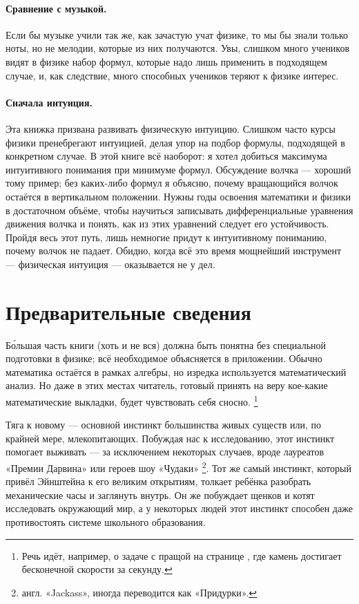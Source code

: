 \paragraph{Сравнение с музыкой.}
Если бы музыке учили так же, как зачастую учат физике, то мы бы знали только ноты, но не мелодии, которые из них получаются.
Увы, слишком много учеников видят в физике набор формул, которые надо лишь применить в подходящем случае, и,
как следствие, много способных учеников теряют к физике интерес.

\paragraph{Сначала интуиция.}
Эта книжка призвана развивать физическую интуицию.
Слишком часто курсы физики пренебрегают интуицией, делая упор на подбор формулы, подходящей в конкретном случае.
В этой книге всё наоборот:
я хотел добиться максимума интуитивного понимания при минимуме формул.
Обсуждение волчка --- хороший тому пример;
без каких-либо формул я объясню, почему вращающийся волчок остаётся в вертикальном положении.
Нужны годы освоения математики и физики в достаточном объёме, чтобы научиться записывать дифференциальные уравнения движения волчка и понять, как из этих уравнений следует его устойчивость.
Пройдя весь этот путь, лишь немногие придут к интуитивному пониманию, почему волчок не падает.
Обидно, когда всё это время мощнейший инструмент --- физическая интуиция --- оказывается не у дел.

\section{Предварительные сведения}

Б\'{о}льшая часть книги (хоть и не вся) должна быть понятна без специальной подготовки в физике;
всё необходимое объясняется в приложении.
Обычно математика остаётся в рамках алгебры, но изредка используется математический анализ.
Но даже в этих местах читатель, готовый принять на веру кое-какие математические выкладки, будет чувствовать себя сносно.%
\footnote{Речь идёт, например, о задаче с пращой на странице \pageref{Задача Давида и Голиафа}, где камень достигает бесконечной скорости за секунду.}

Тяга к новому --- основной инстинкт большинства живых существ или, по крайней мере, млекопитающих.
Побуждая нас к исследованию, этот инстинкт помогает выживать --- за исключением некоторых случаев, вроде лауреатов «Премии Дарвина» или героев шоу «Чудаки»%
\footnote{англ. «Jackass», иногда переводится как «Придурки». \pr}.
Тот же самый инстинкт, который привёл Эйнштейна к его великим открытиям, толкает ребёнка разобрать механические часы и заглянуть внутрь.
Он же побуждает щенков и котят исследовать окружающий мир,
а у некоторых людей этот инстинкт способен даже противостоять системе школьного образования.

